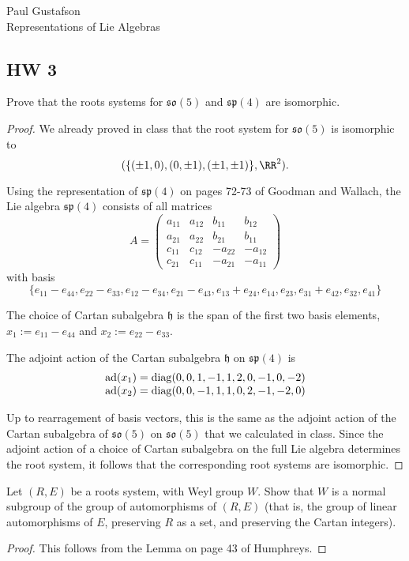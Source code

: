 \documentclass{article}
\DeclareMathOperator{\diag}{diag}
\newcommand{\mf}{\mathfrak}
\begin{document}
\noindent Paul Gustafson\\
\noindent Representations of Lie Algebras


\subsection*{HW 3}
 Prove that the roots systems for $\mf{so}(5)$ and $\mf{sp}(4)$ are isomorphic.

\begin{proof}
We already proved in class that the root system for $\mf{so}(5)$ is isomorphic to 
$$( \{ (\pm 1, 0) , (0, \pm 1), (\pm 1, \pm 1)\}, \RR^2 ).$$

Using the representation of $\mf{sp}(4)$ on pages 72-73 of Goodman and Wallach,
the Lie algebra $\mf{sp}(4)$ consists of all matrices
$$ A = 
\begin{pmatrix}
    a_{11} & a_{12} & b_{11} & b_{12}
\\  a_{21} & a_{22} & b_{21} & b_{11}
\\  c_{11} & c_{12} & -a_{22} & -a_{12}
\\  c_{21} & c_{11} & -a_{21} & -a_{11}
\end{pmatrix}
$$
with basis
$$\{e_{11} - e_{44}, e_{22} - e_{33}, e_{12} - e_{34}, e_{21} - e_{43},  
e_{13} + e_{24}, e_{14}, e_{23}, e_{31} + e_{42}, e_{32}, e_{41} \}$$

The choice of Cartan subalgebra $\mf{h}$ is the span of the first two basis elements,
$x_1 := e_{11} - e_{44}$ and $x_2 := e_{22} - e_{33}$.

The adjoint action of the Cartan subalgebra $\mf{h}$ on $\mf{sp}(4)$ is 
$$
\begin{array}{c}
    \ad(x_1) = \diag(0, 0, 1, -1, 1, 2, 0, -1, 0, -2)
 \\ \ad(x_2) = \diag(0, 0, -1, 1, 1, 0, 2, -1, -2, 0)
\end{array}
$$

Up to rearragement of basis vectors, this is the same as
the adjoint action of the Cartan subalgebra of $\mf{so}(5)$ on $\mf{so}(5)$
that we calculated in class.  Since the adjoint action of a choice of Cartan subalgebra
on the full Lie algebra determines the root system, it follows that the corresponding root systems
are isomorphic.
\end{proof}

 Let $(R,E)$ be a roots system, with Weyl group $W$.  Show that $W$ is a normal subgroup of the group of automorphisms of $(R,E)$ (that is, the group of linear automorphisms of $E$, preserving $R$ as a set, and preserving the Cartan integers). 
\begin{proof}
This follows from the Lemma on page 43 of Humphreys.  
\end{proof}
\end{document}
